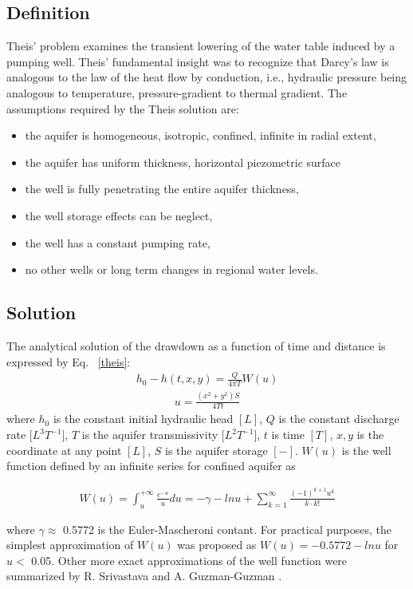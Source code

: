 \subsection{Definition}
%
Theis' problem examines the transient lowering of the water table induced by a pumping well. Theis' fundamental insight was to recognize that Darcy's law is analogous to the law of the heat flow by conduction, i.e., hydraulic pressure being analogous to temperature, pressure-gradient to thermal gradient.
%
The assumptions required by the Theis solution are:
\begin{itemize}
    \item the aquifer is homogeneous, isotropic, confined, infinite in radial extent,
    \item the aquifer has uniform thickness, horizontal piezometric surface
    \item the well is fully penetrating the entire aquifer thickness,
    \item the well storage effects can be neglect, 
    \item the well has a constant pumping rate,
    \item no other wells or long term changes in regional water levels. 
\end{itemize}
%
\subsection{Solution}
The analytical solution of the drawdown as a function of time and distance is expressed by Eq. ~\ref{theis}:
%
\begin{eqnarray}
h_0 - h(t,x,y) = \frac{Q}{4\pi T}W(u)
\label{theis}
\end{eqnarray}
%
\begin{eqnarray}
u = \frac{(x^{2}+y^{2})S}{4Tt}
\label{theis_u}
\end{eqnarray}
%
where $h_0$ is the constant initial hydraulic head $[L]$, $Q$ is the constant discharge rate [$L^{3}T^{-1}$], $T$ is the aquifer transmissivity [$L^{2}T^{-1}$], $t$ is time $[T]$, $x,y$ is the coordinate at any point $[L]$, $S$ is the aquifer storage $[-]$. $W(u)$ is the well function defined by an infinite series for confined aquifer as

\begin{eqnarray}
W(u) = \int^{+\infty}_{u} \frac{e^{-u}}{u} du = -\gamma -lnu + \sum^{\infty}_{k=1}{\frac{(-1)^{k+1}u^k}{k\cdot k!}}
\label{theis_wu}
\end{eqnarray}

where $\gamma\approx$ 0.5772 is the Euler-Mascheroni contant. For practical purposes, the simplest approximation of $W(u)$ was proposed as $W(u)=-0.5772-lnu$  for $u <$ 0.05. Other more exact approximations of the well function were summarized by R. Srivastava and A. Guzman-Guzman \cite{GWAT:GWAT844}.

